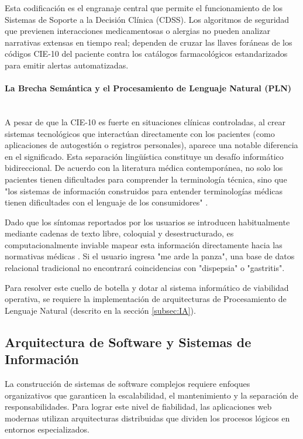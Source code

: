 Esta codificación es el engranaje central que permite el funcionamiento de los Sistemas de Soporte a la Decisión Clínica (CDSS). Los algoritmos de seguridad que previenen interacciones medicamentosas o alergias no pueden analizar narrativas extensas en tiempo real; dependen de cruzar las llaves foráneas de los códigos CIE-10 del paciente contra los catálogos farmacológicos estandarizados para emitir alertas automatizadas.

\paragraph{La Brecha Semántica y el Procesamiento de Lenguaje Natural (PLN)} \leavevmode \\

A pesar de que la CIE-10 es fuerte en situaciones clínicas controladas, al crear sistemas tecnológicos que interactúan directamente con los pacientes (como aplicaciones de autogestión o registros personales), aparece una notable diferencia en el significado. Esta separación lingüística constituye un desafío informático bidireccional. De acuerdo con la literatura médica contemporánea, no solo los pacientes tienen dificultades para comprender la terminología técnica, sino que "los sistemas de información construidos para entender terminologías médicas tienen dificultades con el lenguaje de los consumidores" \cite{ArnottSmith2011}. 

Dado que los síntomas reportados por los usuarios se introducen habitualmente mediante cadenas de texto libre, coloquial y desestructurado, es computacionalmente inviable mapear esta información directamente hacia las normativas médicas \cite{Phawisoot2021}. Si el usuario ingresa "me arde la panza", una base de datos relacional tradicional no encontrará coincidencias con "dispepsia" o "gastritis".

Para resolver este cuello de botella y dotar al sistema informático de viabilidad operativa, se requiere la implementación de arquitecturas de Procesamiento de Lenguaje Natural (descrito en la sección \ref{subsec:IA}).

\subsection{Arquitectura de Software y Sistemas de Información}

La construcción de sistemas de software complejos requiere enfoques organizativos que garanticen la escalabilidad, el mantenimiento y la separación de responsabilidades. Para lograr este nivel de fiabilidad, las aplicaciones web modernas utilizan arquitecturas distribuidas que dividen los procesos lógicos en entornos especializados.

